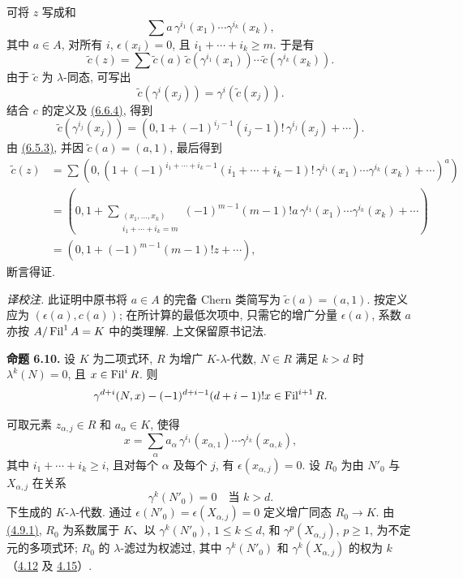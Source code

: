 可将 \(z\) 写成和
\[
  \sum a\,\gamma^{i_1}(x_1)\cdots\gamma^{i_k}(x_k),
\]
其中 \(a\in A\), 对所有 \(i\), \(\epsilon(x_i)=0\), 且 \(i_1+\cdots+i_k\ge m\). 于是有
\[
  \widetilde c(z)=
  \sum \widetilde c(a)\,
        \widetilde c(\gamma^{i_1}(x_1))\cdots
        \widetilde c(\gamma^{i_k}(x_k)).
\]
由于 \(\widetilde c\) 为 \(\lambda\)-同态, 可写出
\[
  \widetilde c(\gamma^i(x_j))=\gamma^i(\widetilde c(x_j)).
\]
结合 \(c\) 的定义及 \hyperlink{sga6.e05.cor.6-6-4}{(6.6.4)}, 得到
\[
  \widetilde c(\gamma^{i_j}(x_j))
  =
  \left(0,1+(-1)^{i_j-1}(i_j-1)!\,\gamma^{i_j}(x_j)+\cdots\right).
\]
由 \hyperlink{sga6.e05.eq.6-5-3}{(6.5.3)}, 并因 \(\widetilde c(a)=(a,1)\), 最后得到
\[
\begin{aligned}
\widetilde c(z)
&=\sum
\left(0,\left(1+
(-1)^{i_1+\cdots+i_k-1}
(i_1+\cdots+i_k-1)!
\,\gamma^{i_1}(x_1)\cdots\gamma^{i_k}(x_k)
+\cdots\right)^a\right)\\
&=
\left(0,1+
\sum_{\substack{(x_1,\ldots,x_k)\\ i_1+\cdots+i_k=m}}
(-1)^{m-1}(m-1)!a\,\gamma^{i_1}(x_1)\cdots\gamma^{i_k}(x_k)
+\cdots\right)\\
&=
(0,1+(-1)^{m-1}(m-1)!z+\cdots),
\end{aligned}
\]
断言得证.

\emph{译校注.} 此证明中原书将 \(a\in A\) 的完备 Chern 类简写为 \(\widetilde c(a)=(a,1)\). 按定义应为 \((\epsilon(a),c(a))\); 在所计算的最低次项中, 只需它的增广分量 \(\epsilon(a)\), 系数 \(a\) 亦按 \(A/\operatorname{Fil}^1A=K\) 中的类理解. 上文保留原书记法.

\textbf{命题 6.10.} 设 \(K\) 为二项式环, \(R\) 为增广 \(K\)-\(\lambda\)-代数, \(N\in R\) 满足 \(k>d\) 时 \(\lambda^k(N)=0\), 且 \(x\in\operatorname{Fil}^iR\). 则
\[
  \gamma^{d+i}(N,x)-(-1)^{d+i-1}(d+i-1)!x\in\operatorname{Fil}^{i+1}R.
\]

可取元素 \(z_{\alpha,j}\in R\) 和 \(a_\alpha\in K\), 使得
\[
  x=\sum_\alpha a_\alpha\,
       \gamma^{i_1}(x_{\alpha,1})\cdots
       \gamma^{i_k}(x_{\alpha,k}),
\]
其中 \(i_1+\cdots+i_k\ge i\), 且对每个 \(\alpha\) 及每个 \(j\), 有 \(\epsilon(x_{\alpha,j})=0\). 设 \(R_0\) 为由 \(N'_0\) 与 \(X_{\alpha,j}\) 在关系
\[
  \gamma^k(N'_0)=0\quad\text{当 }k>d.
\]
下生成的 \(K\)-\(\lambda\)-代数. 通过 \(\epsilon(N'_0)=\epsilon(X_{\alpha,j})=0\) 定义增广同态 \(R_0\to K\). 由 \hyperlink{sga6.e05.para.4-9-1}{(4.9.1)}, \(R_0\) 为系数属于 \(K\)、以 \(\gamma^k(N'_0)\), \(1\le k\le d\), 和 \(\gamma^p(X_{\alpha,j})\), \(p\ge1\), 为不定元的多项式环; \(R_0\) 的 \(\lambda\)-滤过为权滤过, 其中 \(\gamma^k(N'_0)\) 和 \(\gamma^k(X_{\alpha,j})\) 的权为 \(k\)（\hyperlink{sga6.e05.prop.4-12}{4.12} 及 \hyperlink{sga6.e05.cor.4-15}{4.15}）.

